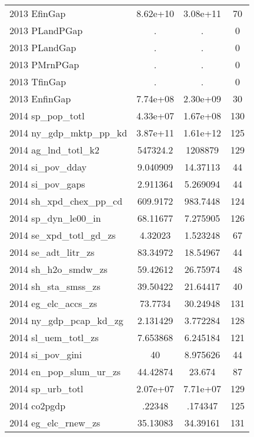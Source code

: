 {\begin{tabular}{l*{1}{ccc}}
2013 EfinGap        &    8.62e+10&    3.08e+11&          70\\
2013 PLandPGap      &           .&           .&           0\\
2013 PLandGap       &           .&           .&           0\\
2013 PMrnPGap       &           .&           .&           0\\
2013 TfinGap        &           .&           .&           0\\
2013 EnfinGap       &    7.74e+08&    2.30e+09&          30\\
2014 sp\_pop\_totl    &    4.33e+07&    1.67e+08&         130\\
2014 ny\_gdp\_mktp\_pp\_kd&    3.87e+11&    1.61e+12&         125\\
2014 ag\_lnd\_totl\_k2 &    547324.2&     1208879&         129\\
2014 si\_pov\_dday    &    9.040909&    14.37113&          44\\
2014 si\_pov\_gaps    &    2.911364&    5.269094&          44\\
2014 sh\_xpd\_chex\_pp\_cd&    609.9172&    983.7448&         124\\
2014 sp\_dyn\_le00\_in &    68.11677&    7.275905&         126\\
2014 se\_xpd\_totl\_gd\_zs&     4.32023&    1.523248&          67\\
2014 se\_adt\_litr\_zs &    83.34972&    18.54967&          44\\
2014 sh\_h2o\_smdw\_zs &    59.42612&    26.75974&          48\\
2014 sh\_sta\_smss\_zs &    39.50422&    21.64417&          40\\
2014 eg\_elc\_accs\_zs &     73.7734&    30.24948&         131\\
2014 ny\_gdp\_pcap\_kd\_zg&    2.131429&    3.772284&         128\\
2014 sl\_uem\_totl\_zs &    7.653868&    6.245184&         121\\
2014 si\_pov\_gini    &          40&    8.975626&          44\\
2014 en\_pop\_slum\_ur\_zs&    44.42874&      23.674&          87\\
2014 sp\_urb\_totl    &    2.07e+07&    7.71e+07&         129\\
2014 co2pgdp        &      .22348&     .174347&         125\\
2014 eg\_elc\_rnew\_zs &    35.13083&    34.39161&         131\\

\end{tabular}}
